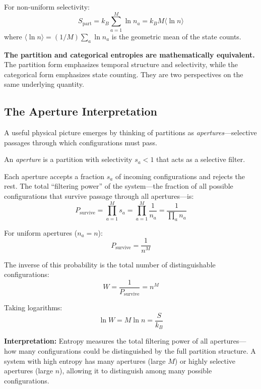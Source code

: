 For non-uniform selectivity:
\begin{equation}
S_{\text{part}} = k_B \sum_{a=1}^{M} \ln n_a = k_B M \langle \ln n \rangle
\end{equation}
where $\langle \ln n \rangle = (1/M)\sum_a \ln n_a$ is the geometric mean of the state counts.

\textbf{The partition and categorical entropies are mathematically equivalent.} The partition form emphasizes temporal structure and selectivity, while the categorical form emphasizes state counting. They are two perspectives on the same underlying quantity.

\subsection{The Aperture Interpretation}

A useful physical picture emerges by thinking of partitions as \textit{apertures}---selective passages through which configurations must pass.

\begin{definition}
An \textit{aperture} is a partition with selectivity $s_a < 1$ that acts as a selective filter.
\end{definition}

Each aperture accepts a fraction $s_a$ of incoming configurations and rejects the rest. The total ``filtering power'' of the system---the fraction of all possible configurations that survive passage through all apertures---is:
\begin{equation}
P_{\text{survive}} = \prod_{a=1}^{M} s_a = \prod_{a=1}^{M} \frac{1}{n_a} = \frac{1}{\prod_a n_a}
\end{equation}

For uniform apertures ($n_a = n$):
\begin{equation}
P_{\text{survive}} = \frac{1}{n^M}
\end{equation}

The inverse of this probability is the total number of distinguishable configurations:
\begin{equation}
W = \frac{1}{P_{\text{survive}}} = n^M
\end{equation}

Taking logarithms:
\begin{equation}
\ln W = M \ln n = \frac{S}{k_B}
\end{equation}

\textbf{Interpretation:} Entropy measures the total filtering power of all apertures---how many configurations could be distinguished by the full partition structure. A system with high entropy has many apertures (large $M$) or highly selective apertures (large $n$), allowing it to distinguish among many possible configurations.

